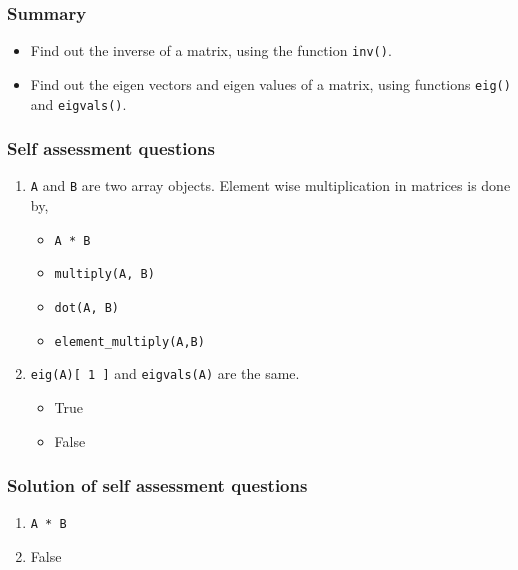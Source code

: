 \documentclass[17pt]{beamer}
\newcounter{saveenumi}
\newcommand{\seti}{\setcounter{saveenumi}{\value{enumi}}}
\begin{document}
\begin{frame}
\frametitle{Summary}
\label{sec-11.2}
\begin{itemize}
\item Find out the inverse of a matrix, using the function \texttt{inv()}. \pause
\item Find out the eigen vectors and eigen values of a matrix, using 
    functions \texttt{eig()} and \texttt{eigvals()}.
\end{itemize}
\end{frame}
\begin{frame}
\frametitle{Self assessment questions}
\label{sec-12.1}

\begin{enumerate}
\item \texttt{A} and \texttt{B} are two array objects. Element wise multiplication in
   matrices is done by,\pause
\begin{itemize}
\item \texttt{A * B}
\item \texttt{multiply(A, B)}
\item \texttt{dot(A, B)}
\item \texttt{element\_multiply(A,B)}\pause
\end{itemize}
\vspace{5pt}
\item \texttt{eig(A)[ 1 ]} and \texttt{eigvals(A)} are the same.\pause
\begin{itemize}
\item True
\item False
\end{itemize}
\seti
\end{enumerate}
\end{frame}
\begin{frame}
\frametitle{Solution of self assessment questions}
\label{sec-13}


\begin{enumerate}
\item \texttt{A * B}\pause
\vspace{12pt}
\item False
\end{enumerate}
\end{frame}
\end{document}
